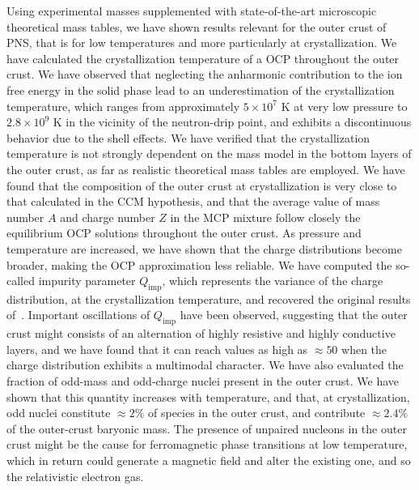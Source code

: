 Using experimental masses supplemented with state-of-the-art microscopic
theoretical mass tables, we have shown results relevant for the outer crust of
PNS, that is for low temperatures and more particularly at crystallization.
We have calculated the crystallization temperature of a OCP throughout the
outer crust. We have observed that neglecting the anharmonic contribution to 
the ion free energy in the solid phase lead to an underestimation of the
crystallization temperature, which ranges from approximately $5\times 10^7$ K 
at very low pressure to $2.8\times 10^9$ K in the vicinity of the neutron-drip 
point, and exhibits a discontinuous behavior due to the shell effects. 
We have verified that the crystallization temperature is not strongly 
dependent on the mass model in the bottom layers of the outer crust, as far as 
realistic theoretical mass tables are employed.
We have found that the composition of the outer crust at crystallization 
is very close to that calculated in the CCM hypothesis, and that the average
value of mass number $A$ and charge number $Z$ in the MCP mixture follow 
closely the equilibrium OCP solutions throughout the outer crust. 
As pressure and temperature are increased, we have shown that the charge 
distributions become broader, making the OCP approximation less reliable.
We have computed the so-called impurity parameter $Q_{\text{imp}}$, which 
represents the variance of the charge distribution, at the crystallization 
temperature, and recovered the original results of~\cite{Fantina2020}.
Important oscillations of $Q_{\text{imp}}$ have been observed, suggesting that
the outer crust might consists of an alternation of highly resistive and 
highly conductive layers, and we have found that it can reach values as high as 
$\approx 50$ when the charge distribution exhibits a multimodal character.
We have also evaluated the fraction of odd-mass and odd-charge nuclei present 
in the outer crust. We have shown that this quantity 
increases with temperature, and that, at crystallization, odd nuclei 
constitute $\approx 2\%$ of species in the outer crust, and contribute 
$\approx 2.4\%$ of the outer-crust baryonic mass. The presence of unpaired
nucleons in the outer crust might be the cause for ferromagnetic phase 
transitions at low temperature, which in return could generate a magnetic field 
and alter the existing one, and so the relativistic electron gas.

